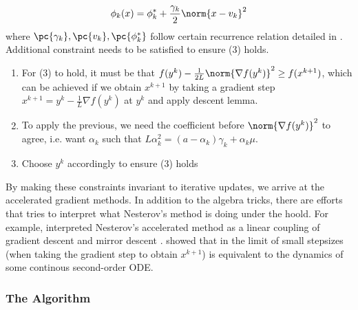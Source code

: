 \documentclass[11pt]{article}
\begin{document}
\[
    \phi_k(x)
        = \phi_k^* + \frac{\gamma_k}{2} \norm{x-v_k}^2    
\]
where $\pc{\gamma_k}, \pc{v_k}, \pc{\phi_k^*}$ follow certain recurrence relation detailed in \cite{nesterovIntroductoryLecturesConvex2004}. Additional constraint needs to be satisfied to ensure (3) holds. 
\begin{enumerate}
    \item For (3) to hold, it must be that $f(y^k) - \frac{1}{2L} \norm{\nabla f(y^k)}^2 \geq f(x^{k+1})$, which can be achieved if we obtain $x^{k+1}$ by taking a gradient step $x^{k+1} = y^k - \frac{1}{L} \nabla f(y^k)$ at $y^k$ and apply descent lemma.
    \item To apply the previous, we need the coefficient before $\norm{\nabla f(y^k)}^2$ to agree, i.e. want $\alpha_k$ such that $L\alpha_k^2 = (a-\alpha_k) \gamma_k + \alpha_k \mu$.
    \item Choose $y^k$ accordingly to ensure (3) holds
\end{enumerate}
By making these constraints invariant to iterative updates, we arrive at the accelerated gradient methods. In addition to the algebra tricks, there are efforts that tries to interpret what Nesterov's method is doing under the hoold. For example, \cite{allen-zhuLinearCouplingUltimate2016} interpreted Nesterov's accelerated method as a linear coupling of gradient descent and mirror descent . \cite{suDifferentialEquationModeling2015} showed that in the limit of small stepsizes (when taking the gradient step to obtain $x^{k+1}$) is equivalent to the dynamics of some continous second-order ODE.


\subsubsection{The Algorithm}
\end{document}
